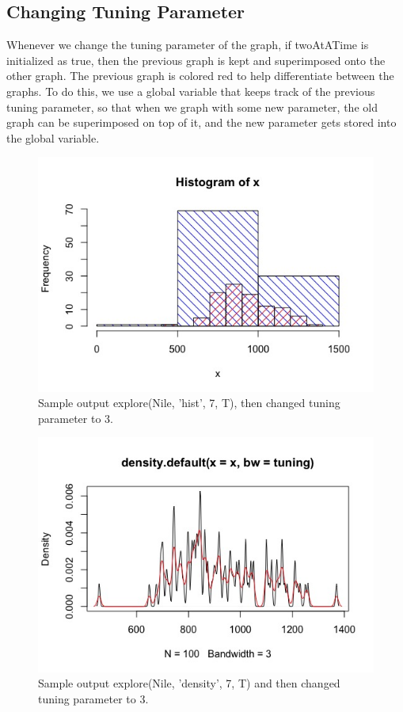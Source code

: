 \documentclass{article}
\begin{document}
\subsection{Changing Tuning Parameter}
Whenever we change the tuning parameter of the graph, if twoAtATime is initialized as true, then the previous graph is kept and superimposed onto the other graph. The previous graph is colored red to help differentiate between the graphs. To do this, we use a global variable that keeps track of the previous tuning parameter, so that when we graph with some new parameter, the old graph can be superimposed on top of it, and the new parameter gets stored into the global variable.

\begin{figure}[H]
\centering
\includegraphics[scale=0.5]{Nile, 3 superimposed on 7 hist.jpeg}
\caption{Sample output explore(Nile, 'hist', 7, T), then changed tuning parameter to 3.}
\label{fig:Nile histogram 3 on 7}
\end{figure}

\begin{figure}[H]
\centering
\includegraphics[scale=0.5]{Nile, 7 superimposed on 3.jpeg}
\caption{Sample output explore(Nile, 'density', 7, T) and then changed tuning parameter to 3. }
\label{fig:Nile density graph 3 on 7}
\end{figure}
\end{document}
